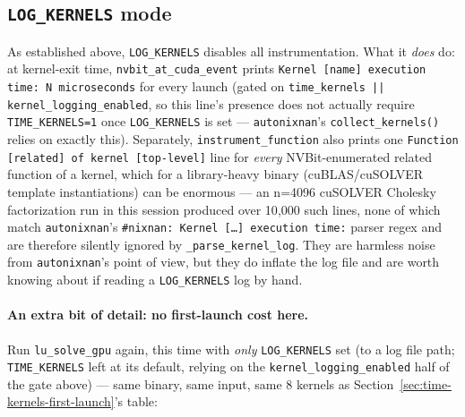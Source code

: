\documentclass[11pt]{article}
\begin{document}
\subsection{\texttt{LOG\_KERNELS} mode}
\label{sec:logkernels}

As established above, \texttt{LOG\_KERNELS} disables all instrumentation.
What it \emph{does} do: at kernel-exit time,
\texttt{nvbit\_at\_cuda\_event} prints
\texttt{Kernel [name] execution time: N microseconds} for every launch
(gated on \texttt{time\_kernels || kernel\_logging\_enabled}, so this
line's presence does not actually require \texttt{TIME\_KERNELS=1} once
\texttt{LOG\_KERNELS} is set --- \texttt{autonixnan}'s
\texttt{collect\_kernels()} relies on exactly this). Separately,
\texttt{instrument\_function} also prints one
\texttt{Function [related] of kernel [top-level]} line for \emph{every}
NVBit-enumerated related function of a kernel, which for a library-heavy
binary (cuBLAS/cuSOLVER template instantiations) can be enormous --- an
n=4096 cuSOLVER Cholesky factorization run in this session produced over
10{,}000 such lines, none of which match \texttt{autonixnan}'s
\texttt{\#nixnan: Kernel [\ldots] execution time:} parser regex and are
therefore silently ignored by \texttt{\_parse\_kernel\_log}. They are
harmless noise from \texttt{autonixnan}'s point of view, but they do
inflate the log file and are worth knowing about if reading a
\texttt{LOG\_KERNELS} log by hand.

\paragraph{An extra bit of detail: no first-launch cost here.} Run
\texttt{lu\_solve\_gpu} again, this time with \emph{only}
\texttt{LOG\_KERNELS} set (to a log file path; \texttt{TIME\_KERNELS} left
at its default, relying on the \texttt{kernel\_logging\_enabled} half of
the gate above) --- same binary, same input, same 8 kernels as
Section~\ref{sec:time-kernels-first-launch}'s table:
\end{document}
